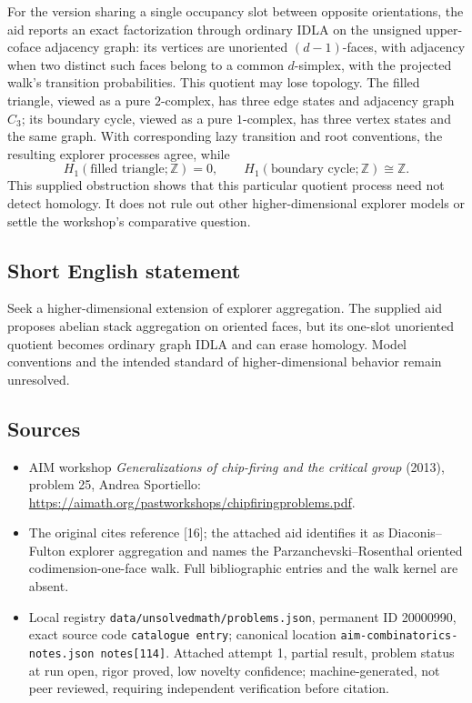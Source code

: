 \documentclass[11pt]{article}
\newcommand{\Z}{\mathbb{Z}}
\begin{document}
For the version sharing a single occupancy slot between opposite orientations, the aid reports an exact factorization through ordinary IDLA on the unsigned upper-coface adjacency graph: its vertices are unoriented $(d-1)$-faces, with adjacency when two distinct such faces belong to a common $d$-simplex, with the projected walk's transition probabilities. This quotient may lose topology. The filled triangle, viewed as a pure $2$-complex, has three edge states and adjacency graph $C_3$; its boundary cycle, viewed as a pure $1$-complex, has three vertex states and the same graph. With corresponding lazy transition and root conventions, the resulting explorer processes agree, while
\[
 H_1(\text{filled triangle};\Z)=0,\qquad
 H_1(\text{boundary cycle};\Z)\cong\Z.
\]
This supplied obstruction shows that this particular quotient process need not detect homology. It does not rule out other higher-dimensional explorer models or settle the workshop's comparative question.
\subsection{Short English statement}
Seek a higher-dimensional extension of explorer aggregation. The supplied aid proposes abelian stack aggregation on oriented faces, but its one-slot unoriented quotient becomes ordinary graph IDLA and can erase homology. Model conventions and the intended standard of higher-dimensional behavior remain unresolved.
\subsection{Sources}
\begin{itemize}
\item AIM workshop \emph{Generalizations of chip-firing and the critical group} (2013), problem 25, Andrea Sportiello: \url{https://aimath.org/pastworkshops/chipfiringproblems.pdf}.
\item The original cites reference [16]; the attached aid identifies it as Diaconis--Fulton explorer aggregation and names the Parzanchevski--Rosenthal oriented codimension-one-face walk. Full bibliographic entries and the walk kernel are absent.
\item Local registry \texttt{data/unsolvedmath/problems.json}, permanent ID 20000990, exact source code \texttt{catalogue entry}; canonical location \texttt{aim-combinatorics-notes.json notes[114]}. Attached attempt 1, partial result, problem status at run open, rigor proved, low novelty confidence; machine-generated, not peer reviewed, requiring independent verification before citation.
\end{itemize}
\end{document}
